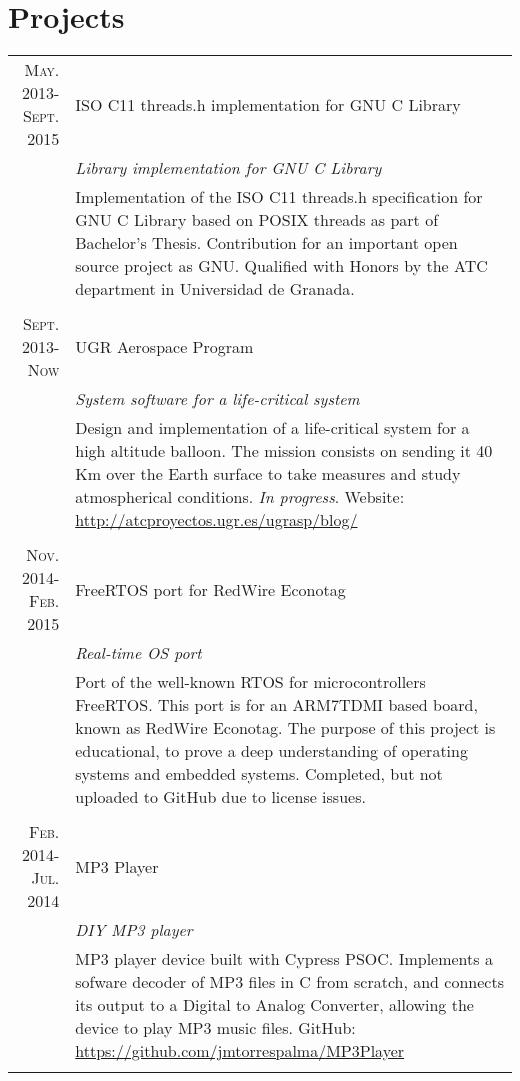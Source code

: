 \documentclass[a4paper,10pt]{article}
\begin{document}
\section{Projects}
\begin{tabular}{r|p{11cm}}
\textsc{May. 2013-Sept. 2015} & ISO C11 threads.h implementation for GNU C
Library \\&\emph{Library implementation for GNU C Library}\\&
\footnotesize{Implementation of the ISO C11 threads.h specification
for GNU C Library based on POSIX threads as part of Bachelor's Thesis.
Contribution for an important open source project as GNU. Qualified
with Honors by the ATC department in Universidad
de Granada.}\\\multicolumn{2}{c}{} \\

\textsc{Sept. 2013-Now} & UGR Aerospace Program \\&\emph{System software for a life-critical system}\\&\footnotesize{Design and implementation of a life-critical system for a high altitude balloon. The mission consists on sending it 40 Km over the Earth surface to take measures and study atmospherical conditions. \emph{In progress}. Website: \url{http://atcproyectos.ugr.es/ugrasp/blog/}  } \\\multicolumn{2}{c}{} \\

\textsc{Nov. 2014-Feb. 2015} & FreeRTOS port for RedWire Econotag \\&\emph{Real-time OS port}\\&\footnotesize{Port of the well-known RTOS for microcontrollers FreeRTOS. This port is for an ARM7TDMI based board, known as RedWire Econotag. The purpose of this project is educational, to prove a deep understanding of operating systems and embedded systems. Completed, but not uploaded to GitHub due to license issues.} \\\multicolumn{2}{c}{} \\

\textsc{Feb. 2014-Jul. 2014} & MP3 Player \\&\emph{DIY MP3 player}\\&\footnotesize{MP3 player device built with Cypress PSOC. Implements a sofware decoder of MP3 files in C from scratch, and connects its output to a Digital to Analog Converter, allowing the device to play MP3 music files. GitHub: \url{https://github.com/jmtorrespalma/MP3Player}} \\\multicolumn{2}{c}{} \\


\end{tabular}
\end{document}
